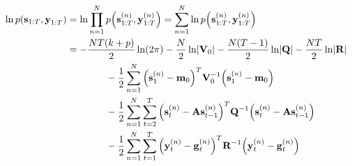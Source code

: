 	\begin{align*}
		\ln p(\boldsymbol{\mathrm{s}}_{1:T}, \boldsymbol{\mathrm{y}}_{1:T})
			&= \ln \prod_{n = 1}^{N} p\Big(\boldsymbol{\mathrm{s}}_{1:T}^{(n)}, \boldsymbol{\mathrm{y}}_{1:T}^{(n)}\Big) = \sum_{n = 1}^{N} \ln p\Big(\boldsymbol{\mathrm{s}}_{1:T}^{(n)}, \boldsymbol{\mathrm{y}}_{1:T}^{(n)}\Big) \\
			&= -\frac{NT(k + p)}{2} \ln(2\pi) - \frac{N}{2} \ln \lvert \boldsymbol{\mathrm{V}}_0 \rvert - \frac{N(T - 1)}{2} \ln \lvert \boldsymbol{\mathrm{Q}} \rvert - \frac{NT}{2} \ln \lvert \boldsymbol{\mathrm{R}} \rvert \\
				&\qquad\qquad -\frac{1}{2} \sum_{n = 1}^{N} \Big( \boldsymbol{\mathrm{s}}_1^{(n)} - \boldsymbol{\mathrm{m}}_0 \Big)^T \boldsymbol{\mathrm{V}}_0^{-1} \Big( \boldsymbol{\mathrm{s}}_1^{(n)} - \boldsymbol{\mathrm{m}}_0 \Big) \\
				&\qquad\qquad -\frac{1}{2} \sum_{n = 1}^{N} \sum_{t = 2}^{T} \Big( \boldsymbol{\mathrm{s}}_t^{(n)} - \boldsymbol{\mathrm{A}} \boldsymbol{\mathrm{s}}_{t - 1}^{(n)} \Big)^T \boldsymbol{\mathrm{Q}}^{-1} \Big( \boldsymbol{\mathrm{s}}_t^{(n)} - \boldsymbol{\mathrm{A}} \boldsymbol{\mathrm{s}}_{t - 1}^{(n)} \Big) \\
				&\qquad\qquad -\frac{1}{2} \sum_{n = 1}^{N} \sum_{t = 1}^{T} \Big( \boldsymbol{\mathrm{y}}_t^{(n)} - \boldsymbol{\mathrm{g}}_t^{(n)} \Big)^T \boldsymbol{\mathrm{R}}^{-1} \Big( \boldsymbol{\mathrm{y}}_t^{(n)} - \boldsymbol{\mathrm{g}}_t^{(n)} \Big)
	\end{align*}

